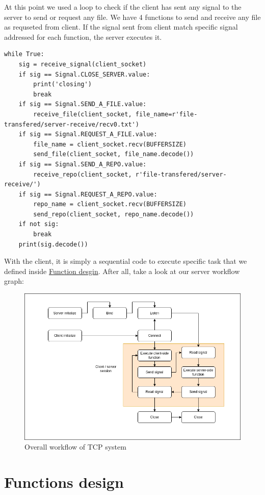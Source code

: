 \documentclass{article}
\begin{document}
At this point we used a loop to check if the client has sent any signal to the server to send or request any file. We have 4 functions to send and receive any file as requseted from client.
If the signal sent from client match specific signal addressed for each function, the server executes it. \pagebreak
\begin{lstlisting}[frame=single]
  while True:
    sig = receive_signal(client_socket)
    if sig == Signal.CLOSE_SERVER.value:
        print('closing')
        break
    if sig == Signal.SEND_A_FILE.value:
        receive_file(client_socket, file_name=r'file-transfered/server-receive/recv0.txt')
    if sig == Signal.REQUEST_A_FILE.value:
        file_name = client_socket.recv(BUFFERSIZE)
        send_file(client_socket, file_name.decode())
    if sig == Signal.SEND_A_REPO.value:
        receive_repo(client_socket, r'file-transfered/server-receive/')
    if sig == Signal.REQUEST_A_REPO.value:
        repo_name = client_socket.recv(BUFFERSIZE)
        send_repo(client_socket, repo_name.decode())
    if not sig:
        break
    print(sig.decode())
\end{lstlisting} 
With the client, it is simply a sequential code to execute specific task that we defined inside \hyperref[functions]{Function desgin}.
After all, take a look at our server workflow graph:
\begin{figure}[H]
  \centering
  \includegraphics[scale=0.6]{TCP_server.png}
  \caption{Overall workflow of TCP system}
\end{figure}

\section*{Functions design}\label{functions}
\end{document}
